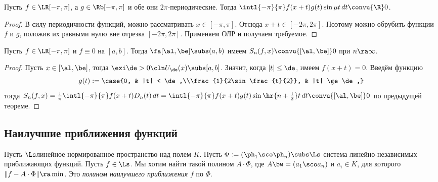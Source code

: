 \documentclass[a4paper]{article}
\newcommand{\intlpp}{\intl{-\pi}{\pi}}
\newcommand{\frpi}{\frac{1}{\pi}}
\begin{document}
\begin{theorem}
Пусть $f\in\LR[-\pi,\pi]$, а $g \in\Rb[-\pi,\pi]$ и обе они $2\pi$-периодические. Тогда $\intlpp
f(x+t)g(t)\sin \mu t \,d t \convu{\R} 0$.
\end{theorem}
\begin{proof}
В силу периодичности функций, можно рассматривать $x \in [-\pi,\pi]$. Отсюда $x + t \in [-2\pi,2\pi]$. Поэтому можно обрубить функции $f$ и $g$,
положив их равными нулю вне отрезка $[-2\pi,2\pi]$. Применяем ОЛР и получаем требуемое.
\end{proof}

\begin{theorem}
Пусть $f \in\LR[-\pi,\pi]$ и $f \equiv 0$ на $[a,b]$. Тогда $\fa [\al,\be] \subs (a,b)$ имеем
$S_n(f,x) \convu{[\al,\be]} 0$ при $n \ra \infty$.
\end{theorem}
\begin{proof}
Пусть $x \in [\al,\be]$, тогда $\exi \de > 0\cln U_\de(x) \subs [a,b]$. Значит, когда $|t| \le \de$,
имеем $f(x+t)= 0$. Введём функцию
$$g(t) := \case{0, & |t| < \de,\\\frac{1}{2\sin\frac{t}{2}}, & |t| \ge \de,}$$
тогда $S_n(f,x) = \frpi \intlpp f(x+t)D_n(t)\,d t = \intlpp f(x+t)g(t)\sin\hr{n +
\frac{1}{2}}t \,d t \convu{[\al,\be]} 0$ по предыдущей теореме.
\end{proof}

\subsection{Наилучшие приближения функций}

Пусть $\Ls$\т линейное нормированное пространство над полем $K$. Пусть $\Phi := (\ph_1\sco\ph_n) \subs \Ls$\т
система линейно-независимых приближающих функций. Пусть $f \in \Ls$. Мы хотим найти такой полином
$A \cdot \Phi$, где $A \bw= (a_1\sco a_n)$ и $a_i \in K$, для которого $\|f - A\cdot \Phi\| \ra \min$.
Это \emph{полином наилучшего приближения} $f$ по $\Phi$.
\end{document}
